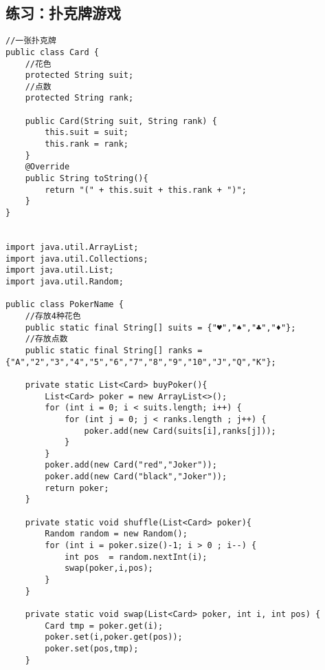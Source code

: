 \documentclass[a4paper]{report}
\begin{document}
\subsection{练习：扑克牌游戏}
\begin{lstlisting}
//一张扑克牌
public class Card {
    //花色
    protected String suit;
    //点数
    protected String rank;

    public Card(String suit, String rank) {
        this.suit = suit;
        this.rank = rank;
    }
    @Override
    public String toString(){
        return "(" + this.suit + this.rank + ")";
    }
}


import java.util.ArrayList;
import java.util.Collections;
import java.util.List;
import java.util.Random;

public class PokerName {
    //存放4种花色
    public static final String[] suits = {"♥","♠","♣","♦"};
    //存放点数
    public static final String[] ranks = {"A","2","3","4","5","6","7","8","9","10","J","Q","K"};

    private static List<Card> buyPoker(){
        List<Card> poker = new ArrayList<>();
        for (int i = 0; i < suits.length; i++) {
            for (int j = 0; j < ranks.length ; j++) {
                poker.add(new Card(suits[i],ranks[j]));
            }
        }
        poker.add(new Card("red","Joker"));
        poker.add(new Card("black","Joker"));
        return poker;
    }

    private static void shuffle(List<Card> poker){
        Random random = new Random();
        for (int i = poker.size()-1; i > 0 ; i--) {
            int pos  = random.nextInt(i);
            swap(poker,i,pos);
        }
    }

    private static void swap(List<Card> poker, int i, int pos) {
        Card tmp = poker.get(i);
        poker.set(i,poker.get(pos));
        poker.set(pos,tmp);
    }


\end{lstlisting}
\end{document}
